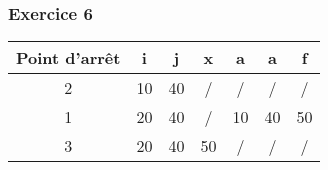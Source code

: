 \subsubsection{Exercice 6}
 
\begin{tabular}{c |  c  c  c  c  c  c  }
	\textbf{Point d'arrêt} & \textbf{i} & \textbf{j} & \textbf{x} & \textbf{a} & \textbf{a} & \textbf{f}\\
	\hline
	2&10&40&/&/&/&/\\
	\hline
	1 & 20 & 40 & / & 10 & 40 & 50\\
	\hline
	3 & 20 & 40 & 50 & / & / & /\\
	\hline
\end{tabular}

